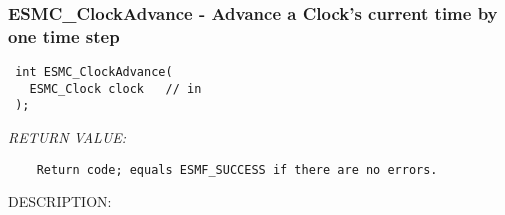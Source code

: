  
\setlength{\oldparskip}{\parskip}
\setlength{\parskip}{1.5ex}
\setlength{\oldparindent}{\parindent}
\setlength{\parindent}{0pt}
\setlength{\oldbaselineskip}{\baselineskip}
\setlength{\baselineskip}{11pt}
 
\def\bv{\begin{verbatim}}
\def\ev{\end{verbatim}}
\def\be{\begin{equation}}
\def\ee{\end{equation}}
\def\bea{\begin{eqnarray}}
\def\eea{\end{eqnarray}}
\def\bi{\begin{itemize}}
\def\ei{\end{itemize}}
\def\bn{\begin{enumerate}}
\def\en{\end{enumerate}}
\def\bd{\begin{description}}
\def\ed{\end{description}}
\def\({\left (}
\def\){\right )}
\def\[{\left [}
\def\]{\right ]}
\def\<{\left  \langle}
\def\>{\right \rangle}
\def\cI{{\cal I}}
\def\diag{\mathop{\rm diag}}
\def\tr{\mathop{\rm tr}}


 
\subsubsection [ESMC\_ClockAdvance] {ESMC\_ClockAdvance - Advance a Clock's current time by one time step}


 
  
\begin{verbatim} int ESMC_ClockAdvance(
   ESMC_Clock clock   // in
 );
 \end{verbatim}{\em RETURN VALUE:}
\begin{verbatim}    Return code; equals ESMF_SUCCESS if there are no errors.\end{verbatim}
{\sf DESCRIPTION:\\ }


